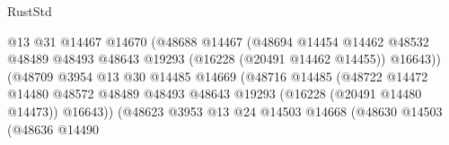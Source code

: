 \begin{lexlean}{RustStd}
\begin{coremodule}
                                                @13
                                                @31
                                                @14467
                                                @14670
                                                (@48688
                                                  @14467
                                                  (@48694
                                                    @14454
                                                    @14462
                                                    @48532
                                                    @48489
                                                    @48493
                                                    @48643
                                                    @19293
                                                    (@16228 (@20491 @14462 @14455))
                                                    @16643))
                                                (@48709
                                                  @3954
                                                  @13
                                                  @30
                                                  @14485
                                                  @14669
                                                  (@48716
                                                    @14485
                                                    (@48722
                                                      @14472
                                                      @14480
                                                      @48572
                                                      @48489
                                                      @48493
                                                      @48643
                                                      @19293
                                                      (@16228 (@20491 @14480 @14473))
                                                      @16643))
                                                  (@48623
                                                    @3953
                                                    @13
                                                    @24
                                                    @14503
                                                    @14668
                                                    (@48630
                                                      @14503
                                                      (@48636
                                                        @14490

\end{coremodule}
\end{lexlean}
